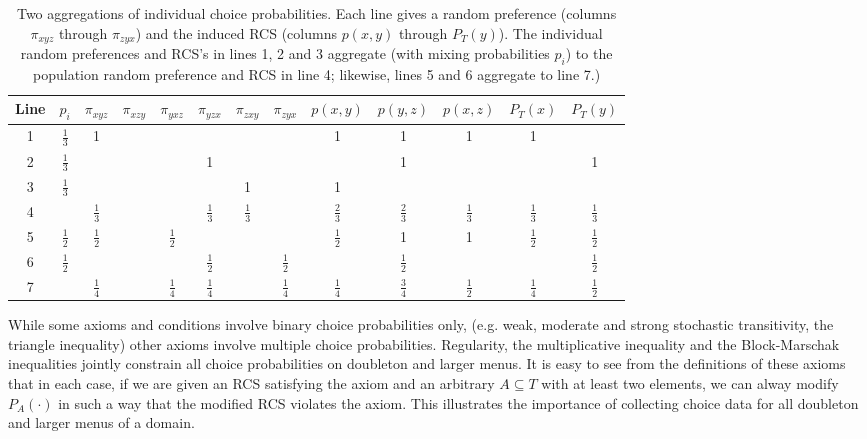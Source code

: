 \documentclass[11pt,letter]{article}
\newcommand{\menus}{menus}
\begin{document}
\begin{table}
	\centering
	\def\arraystretch{1.4}
	\begin{tabular}{cc|cccccc|ccccc}
		Line & $p_i$ & $\pi_{xyz}$ & $\pi_{xzy}$ & $\pi_{yxz}$ & $\pi_{yzx}$ & $\pi_{zxy}$ & $\pi_{zyx}$
		& $p(x,y)$ & $p(y,z)$ & $p(x,z)$ & $P_T(x)$ & $P_T(y)$ \\
		\hline
		1 & $\frac{1}{3}$ & 1 & & & & & & 1 & 1 & 1 & 1 \\
		2 & $\frac{1}{3}$ & & & & 1 & & & & 1 & & & 1 \\
		3 & $\frac{1}{3}$ & & & & & 1 & & 1 \\
		\hline
		4 & & $\frac{1}{3}$ & & & $\frac{1}{3}$ & $\frac{1}{3}$ & & $\frac{2}{3}$ & $\frac{2}{3}$ & $\frac{1}{3}$  & $\frac{1}{3}$  & $\frac{1}{3}$ \\
		\hline
		5 & $\frac{1}{2}$ & $\frac{1}{2}$ & & $\frac{1}{2}$ & & & & $\frac{1}{2}$ & 1 & 1 & $\frac{1}{2}$ & $\frac{1}{2}$ \\
		6 & $\frac{1}{2}$ & & & & $\frac{1}{2}$ & & $\frac{1}{2}$ & & $\frac{1}{2}$ & & & $\frac{1}{2}$ \\
		\hline
		7 & & $\frac{1}{4}$ & & $\frac{1}{4}$ & $\frac{1}{4}$ & & $\frac{1}{4}$ & $\frac{1}{4}$ & $\frac{3}{4}$ & $\frac{1}{2}$ & $\frac{1}{4}$ & $\frac{1}{2}$ \\
		\hline
	\end{tabular}\caption{Two aggregations of individual choice probabilities.
	Each line gives a random preference (columns $\pi_{xyz}$ through $\pi_{zyx}$) and the induced RCS (columns $p(x,y)$ through $P_T(y)$).
	The individual random preferences and RCS's in lines 1, 2 and 3 aggregate (with mixing probabilities $p_i$) to the population random preference and RCS in line 4; likewise, lines 5 and 6 aggregate to line 7.)}\label{t:notconvex}
\end{table}

While some axioms and conditions involve binary choice probabilities only, (e.g. weak, moderate and strong stochastic transitivity, the triangle inequality) other axioms involve multiple choice probabilities.
Regularity, the multiplicative inequality and the Block-Marschak inequalities jointly constrain all choice probabilities on doubleton and larger \menus{}.
It is easy to see from the definitions of these axioms that in each case, if we are given an RCS satisfying the axiom and an arbitrary $A \subseteq T$ with at least two elements, we can alway modify $P_A(\cdot)$ in such a way that the modified RCS violates the axiom.
This illustrates the importance of collecting choice data for all doubleton and larger menus of a domain.
\end{document}

